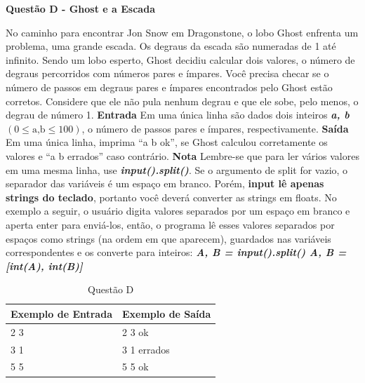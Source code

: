 \documentclass[a4paper, 12pt]{article}
\begin{document}
\newpage %
\begin{center}
\textbf{{\Large Questão D - Ghost e a Escada}}
\end{center}
\vspace{5pt}
No caminho para encontrar Jon Snow em Dragonstone, o lobo Ghost enfrenta um problema, uma grande escada. Os degraus da escada são numeradas de 1 até infinito. Sendo um lobo esperto, Ghost decidiu calcular dois valores, o número de degraus percorridos com números pares e ímpares. \newline \newline
Você precisa checar se o número de passos em degraus pares e ímpares encontrados pelo Ghost estão corretos. Considere que ele não pula nenhum degrau e que ele sobe, pelo menos, o degrau de número 1. 
\newline \newline
\textbf{{\large Entrada}} \newline
Em uma única linha são dados dois inteiros \textit{\textbf{a, b}} $(0 \leq \textrm{a,b} \leq 100)$, o número de passos pares e ímpares, respectivamente. 
\newline \newline
\textbf{{\large Saída}} \newline
Em uma única linha, imprima ``a b ok'', se Ghost calculou corretamente os valores e ``a b errados'' caso contrário.
\newline \newline
\textbf{{\large Nota}} \newline
Lembre-se que para ler vários valores em uma mesma linha, use \textbf{\textit{input().split()}}. Se o argumento de split for vazio, o separador das variáveis é um espaço em branco. Porém, \textbf{input lê apenas strings do teclado}, portanto você deverá converter as strings em floats. No exemplo a seguir, o usuário digita valores separados por um espaço em branco e aperta enter para enviá-los, então, o programa lê esses valores separados por espaços como strings (na ordem em que aparecem), guardados nas variáveis correspondentes e os converte para inteiros: \newline
\textbf{\textit{A, B = input().split() \newline
A, B = [int(A), int(B)]}}
\newline
\begin{table}[H]
	\centering
	\begin{tabular}{|l|l|}
	\hline
	\textbf{Exemplo de Entrada} & \textbf{Exemplo de Saída} \\ \hline
	2 3 & 2 3 ok \\ \hline
	3 1 & 3 1 errados \\ \hline
	5 5 & 5 5 ok \\ \hline
	\end{tabular}
	\caption{Questão D}
	\label{tabela4}
\end{table}
\end{document}
